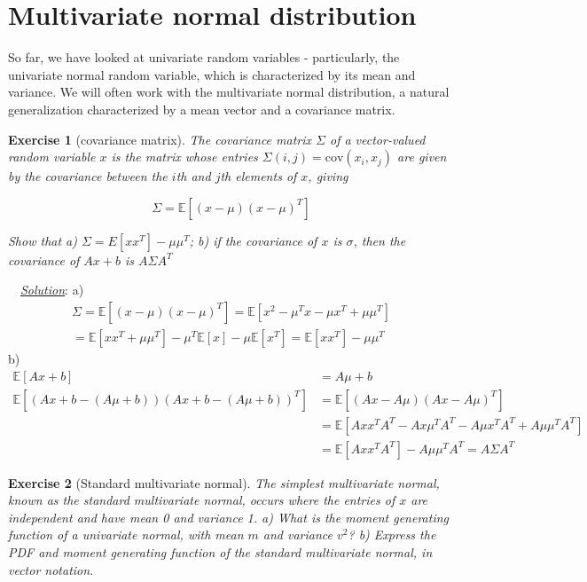 \documentclass[twoside]{article}
\newcounter{lecnum}
\newtheorem{exercise}{Exercise}[lecnum]
\newenvironment{solution}{
  \begin{flushleft} \noindent ~~\underline{\emph{Solution}}: \rmfamily}{\end{flushleft}}
\newcommand\E{\mathbb{E}}
\newcommand\cov{\mbox{cov}}
\begin{document}
\section{Multivariate normal distribution}

So far, we have looked at univariate random variables - particularly, the univariate normal random variable, which is characterized by its mean and variance. We will often work with the multivariate normal distribution, a natural generalization characterized by a mean vector and a covariance matrix.

\begin{exercise}[covariance matrix]
  The covariance matrix $\Sigma$ of a vector-valued random variable $x$ is the matrix whose entries $\Sigma(i,j) = \cov(x_i,x_j)$ are given by the covariance between the $i$th and $j$th elements of $x$, giving

  $$\Sigma = \E\left[(x-\mu)(x-\mu)^T\right]$$

  Show that a) $\Sigma = E[xx^T] - \mu\mu^T$; b) if the covariance of $x$ is $\sigma$, then the covariance of $Ax+b$ is $A\Sigma A^T$
\end{exercise}

\begin{solution}
a)  
\begin{equation*}
\begin{split}
\Sigma = \E\left[(x-\mu)(x-\mu)^T\right] = \E[x^2 -\mu^Tx-\mu x^T+\mu\mu^T] \\
= \E[xx^T+\mu\mu^T]-\mu^T\E[x] -\mu\E[x^T] = \E[xx^T]-\mu\mu^T
\end{split}
\end{equation*}
b)
\begin{equation*}
\begin{split}
\E[Ax+b] &= A\mu+b \\
\E[(Ax+b-(A\mu+b))(Ax+b-(A\mu+b))^T] &= \E[(Ax-A\mu)(Ax-A\mu)^T] \\
&= \E[Axx^TA^T-Ax\mu^TA^T-A\mu x^TA^T+A\mu\mu^TA^T] \\
&= \E[Axx^TA^T]-A\mu\mu^TA^T = A\Sigma A^T
\end{split}
\end{equation*}
\end{solution}

\begin{exercise}[Standard multivariate normal]
  The simplest multivariate normal, known as the standard multivariate normal, occurs where the entries of $x$ are independent and have mean 0 and variance 1. a) What is the moment generating function of a univariate normal, with mean $m$ and variance $v^2$? b) Express the PDF and moment generating function of the standard multivariate normal, in vector notation.
\end{exercise}
\end{document}
